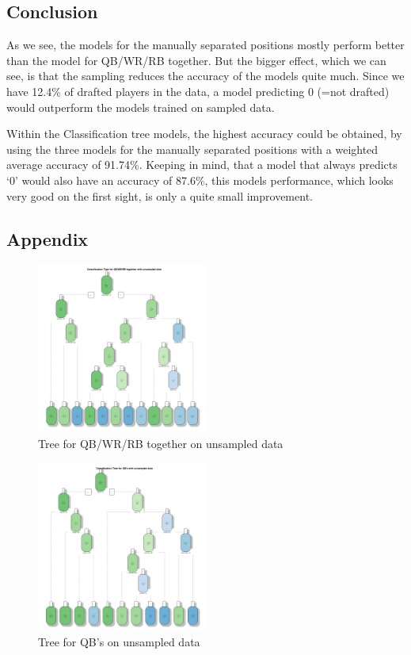 \documentclass[]{article}
\begin{document}
\hypertarget{conclusion}{%
\subsection{Conclusion}\label{conclusion}}

As we see, the models for the manually separated positions mostly
perform better than the model for QB/WR/RB together. But the bigger
effect, which we can see, is that the sampling reduces the accuracy of
the models quite much. Since we have 12.4\% of drafted players in the
data, a model predicting 0 (=not drafted) would outperform the models
trained on sampled data.

Within the Classification tree models, the highest accuracy could be
obtained, by using the three models for the manually separated positions
with a weighted average accuracy of 91.74\%. Keeping in mind, that a
model that always predicts `0' would also have an accuracy of 87.6\%,
this models performance, which looks very good on the first sight, is
only a quite small improvement.

\hypertarget{appendix}{%
\subsection{Appendix}\label{appendix}}

\begin{figure}
\hypertarget{id}{%
\centering
\includegraphics[width=0.5\textwidth,height=\textheight]{../../Project_Scripts/TogethertreeNS.jpg}
\caption{Tree for QB/WR/RB together on unsampled data}\label{id}
}
\end{figure}

\begin{figure}
\hypertarget{id}{%
\centering
\includegraphics[width=0.5\textwidth,height=\textheight]{../../Project_Scripts/QBtreeNS.jpg}
\caption{Tree for QB's on unsampled data}\label{id}
}
\end{figure}
\end{document}
